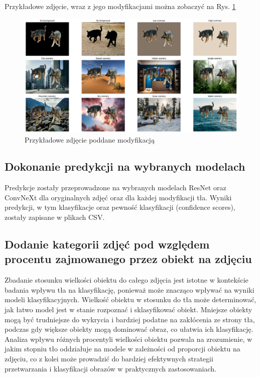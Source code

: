 Przykładowe zdjęcie, wraz z jego modyfikacjami można zobaczyć na Rys. \ref*{rys:modified}

\begin{figure}
	\centering\includegraphics[width=.9\textwidth]{img/modified}
	\caption{Przykładowe zdjęcie poddane modyfikacją}  \label{rys:modified}
\end{figure}

\subsection*{Dokonanie predykcji na wybranych modelach}

Predykcje zostały przeprowadzone na wybranych modelach ResNet oraz ConvNeXt dla oryginalnych zdjęć oraz dla każdej 
modyfikacji tła. Wyniki predykcji, w tym klasyfikacje oraz pewność klasyfikacji (confidence scores), zostały zapisane w
plikach CSV.

\subsection*{Dodanie kategorii zdjęć pod względem procentu zajmowanego przez obiekt na zdjęciu}

Zbadanie stosunku wielkości obiektu do całego zdjęcia jest istotne w kontekście badania wpływu tła na klasyfikację, ponieważ 
może znacząco wpływać na wyniki modeli klasyfikacyjnych. Wielkość obiektu w stosunku do tła może determinować, jak łatwo model 
jest w stanie rozpoznać i sklasyfikować obiekt. Mniejsze obiekty mogą być trudniejsze do wykrycia i bardziej podatne na 
zakłócenia ze strony tła, podczas gdy większe obiekty mogą dominować obraz, co ułatwia ich klasyfikację. Analiza wpływu różnych 
procentyli wielkości obiektu pozwala na zrozumienie, w jakim stopniu tło oddziałuje na modele w zależności od proporcji obiektu 
na zdjęciu, co z kolei może prowadzić do bardziej efektywnych strategii przetwarzania i klasyfikacji obrazów w praktycznych 
zastosowaniach.

